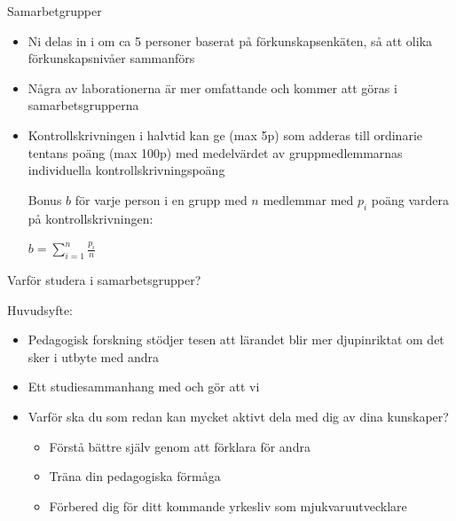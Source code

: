 \begin{Slide}{Samarbetgrupper}\footnotesize
\begin{itemize}
\item Ni delas in i  om ca 5 personer baserat på förkunskapsenkäten, så att olika förkunskapsnivåer sammanförs
\item Några av laborationerna är mer omfattande  och kommer att göras i samarbetsgrupperna \\ \vspace{1em}
\item Kontrollskrivningen i halvtid kan ge  (max 5p) som adderas till ordinarie tentans poäng (max 100p) med medelvärdet av gruppmedlemmarnas individuella kontrollskrivningspoäng
\scriptsize \parbox{7cm}{Bonus $b$ för varje person i en grupp med $n$ medlemmar med $p_i$ poäng vardera på kontrollskrivningen:}
 \hspace{5mm} $\displaystyle b = \sum\limits_{i=1}^n \frac{p_i}{n}$
\end{itemize}
\end{Slide}

\fi

\begin{Slide}{Varför studera i samarbetsgrupper?}

Huvudsyfte: 

\begin{itemize}
\item Pedagogisk forskning stödjer tesen att lärandet blir mer djupinriktat om det sker i utbyte med andra
\item Ett studiesammanhang med  och  gör att vi 
\item Varför ska du som redan kan mycket aktivt dela med dig av dina kunskaper?
\begin{itemize}
\item Förstå bättre själv genom att förklara för andra
\item Träna din pedagogiska förmåga
\item Förbered dig för ditt kommande yrkesliv som mjukvaruutvecklare
\end{itemize}
\end{itemize}
\end{Slide}


